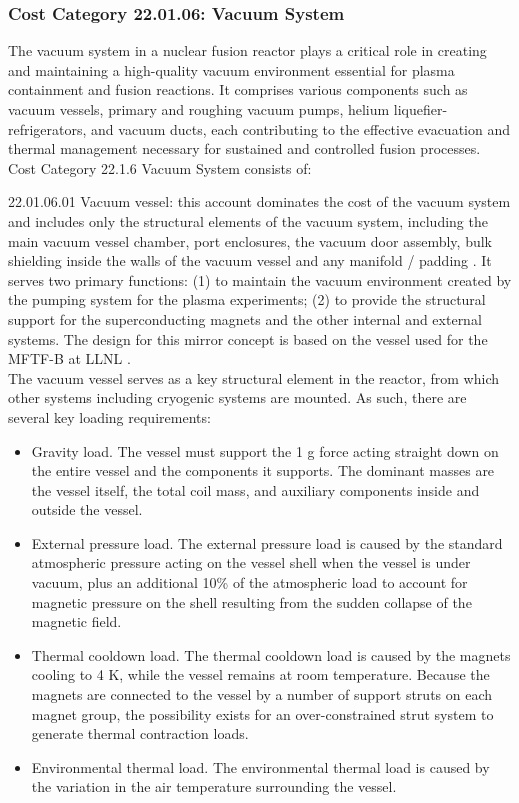 \subsubsection*{Cost Category 22.01.06: Vacuum System}

The vacuum system in a nuclear fusion reactor plays a critical role in creating and maintaining a high-quality vacuum environment essential for plasma containment and fusion reactions. It comprises various components such as vacuum vessels, primary and roughing vacuum pumps, helium liquefier-refrigerators, and vacuum ducts, each contributing to the effective evacuation and thermal management necessary for sustained and controlled fusion processes. Cost Category 22.1.6 Vacuum System consists of:  

22.01.06.01 Vacuum vessel: this account dominates the cost of the vacuum system and includes only the structural elements of the vacuum system, including the main vacuum vessel chamber, port enclosures, the vacuum door assembly, bulk shielding inside the walls of the vacuum vessel and any manifold / padding \cite{waganer2006design}. It serves two primary functions: (1) to maintain the vacuum environment created by the pumping system for the plasma experiments; (2) to provide the structural support for the superconducting magnets and the other internal and external systems. The design for this mirror concept is based on the vessel used for the MFTF-B at LLNL \cite{gerich1986design}. \\

The vacuum vessel serves as a  key structural element in the reactor, from which other systems including cryogenic systems are mounted.  As such, there are several key loading requirements:

\begin{itemize}
    \item Gravity load. The vessel must support the 1 g force acting straight down on the entire vessel and the components it supports. The dominant masses are the vessel itself, the total coil mass, and auxiliary components inside and outside the vessel.

    \item External pressure load. The external pressure load is caused by the standard atmospheric pressure acting on the vessel shell when the vessel is under vacuum, plus an additional 10\% of the atmospheric load to account for magnetic  pressure on the shell resulting from the sudden collapse of the magnetic field. 

    \item Thermal cooldown load. The thermal cooldown load is  caused by the magnets cooling to 4 K, while the vessel remains at room temperature. Because the magnets are connected to the vessel by a number of support struts on each  magnet group, the possibility exists for an over-constrained  strut system to generate thermal contraction loads.

    \item Environmental thermal load. The environmental thermal load is caused by the variation in the air temperature surrounding the vessel.

\end{itemize}

